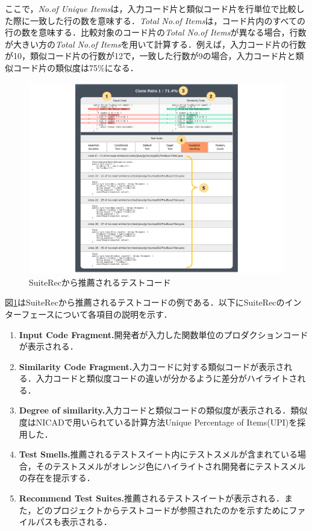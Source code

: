 \documentclass[12pt]{jarticle} %
\begin{document}
ここで，{\it No.of Unique Items}は，入力コード片と類似コード片を行単位で比較した際に一致した行の数を意味する．{\it Total No.of Items}は，コード片内のすべての行の数を意味する．比較対象のコード片の{\it Total No.of Items}が異なる場合，行数が大きい方の{\it Total No.of Items}を用いて計算する．例えば，入力コード片の行数が10，類似コード片の行数が12で，一致した行数が9の場合，入力コード片と類似コード片の類似度は75\%になる．

\begin{figure}[htbp]
  \begin{center}
    \includegraphics[clip,width=15cm]{SuiteRec.pdf}
    \caption{SuiteRecから推薦されるテストコード}
    \label{SR}
  \end{center}
\end{figure}

図\ref{SR}は{\sf SuiteRec}から推薦されるテストコードの例である．以下に{\sf SuiteRec}のインターフェースについて各項目の説明を示す．

\newpage
 \begin{enumerate}
\renewcommand{\labelenumi}{(\arabic{enumi})}
\item{\textbf{Input Code Fragment.}開発者が入力した関数単位のプロダクションコードが表示される．}
\item{\textbf{Similarity Code Fragment.}入力コードに対する類似コードが表示される．入力コードと類似度コードの違いが分かるように差分がハイライトされる．}
\item{\textbf{Degree of similarity.}入力コードと類似コードの類似度が表示される．類似度はNICADで用いられている計算方法Unique Percentage of Items(UPI)を採用した．}
\item{\textbf{Test Smells.}推薦されるテストスイート内にテストスメルが含まれている場合，そのテストスメルがオレンジ色にハイライトされ開発者にテストスメルの存在を提示する．}
\item{\textbf{Recommend Test Suites.}推薦されるテストスイートが表示される．また，どのプロジェクトからテストコードが参照されたのかを示すためにファイルパスも表示される．}
\end{enumerate}
\end{document}
